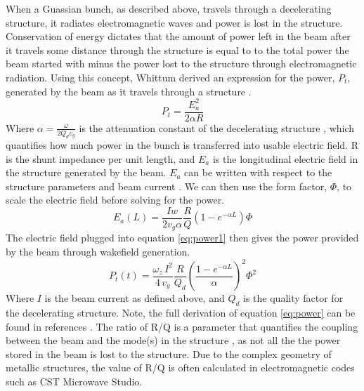 When a Guassian bunch, as described above, travels through a 
decelerating structure, it radiates electromagnetic waves and 
power is lost in the structure. Conservation of energy dictates 
that the amount of power left in the beam 
after it travels some distance through the structure is equal to 
to the total power the beam started with
minus the power lost to the structure through electromagnetic radiation. 
Using this concept, Whittum derived an expression for the power, $P_t$, 
generated by the beam as it travels through a structure \cite{Whittum}. 
\begin{equation}
P_t = \frac{E^2_a}{2 \alpha R}
\label{eq:power1}
\end{equation} 
Where $\alpha=\frac{\omega}{2Q_{d}v_{g}}$ is the attenuation constant of the 
decelerating structure \cite{CLICdesignReport, Whittum}, which quantifies 
how much power in the bunch is transferred into usable electric field. R is the shunt impedance
per unit length, and $E_a$ is the longitudinal electric field in the structure
generated by the beam. 
$E_a$ can be written with respect to 
the structure parameters and beam current \cite{PETSeq}. 
We can then use the form factor, $\Phi$, to scale the electric field before 
solving for the power. 
\begin{equation}
E_a\left(L\right) = \frac{Iw}{2 v_g \alpha} \frac{R}{Q} \left(1-e^{-\alpha L}\right) \Phi
\end{equation}
The electric field plugged into equation \ref{eq:power1} then gives the power provided
by the beam through wakefield generation.
\begin{equation}
P_{t}(t)=\frac{\omega_{z}\,I^{2}}{4\,v_{g}}\frac{R}{Q_d}\left(\frac{1-e^{-\alpha L}}{\alpha}\right)^2\Phi^{2}
\label{eq:power}
\end{equation}
Where $I$ is the beam current as defined above, and $Q_{d}$ is the quality factor for the decelerating
structure. Note, the full derivation of equation \ref{eq:power} can be found in references
\cite{PETSeq}. The ratio of R/Q is a parameter that quantifies the coupling between
the beam and the mode(s) in the structure \cite{Whittum}, as not all the the power stored in 
the beam is lost to the structure. Due to the complex geometry of metallic structures,
the value of R/Q is often calculated in electromagnetic codes such
as CST Microwave Studio. 

